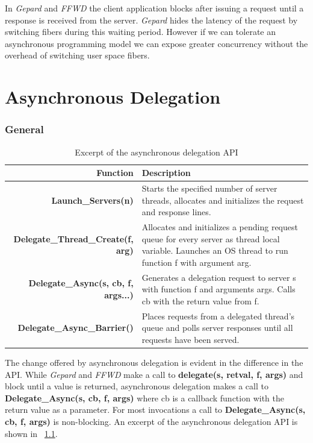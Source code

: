 \documentclass{uicthesi}
\begin{document}
In \textit{Gepard} and \textit{FFWD} the client application blocks after issuing a request until a response is received from the server. \textit{Gepard} hides the latency of the request by switching fibers during this waiting period. However if we can tolerate an asynchronous programming model we can expose greater concurrency without the overhead of switching user space fibers. 


\chapter{Asynchronous Delegation}
\subsection{General}
\begin{table}[ht!]
\begin{tabularx}{\linewidth}{| r | X |} %
  \hline
  \bf{Function} & \bf{Description} \\
  \hline
  \bf{Launch\_Servers(n)} & Starts the specified number of server threads, allocates and initializes the request and response lines. \\
  \hline
  \bf{Delegate\_Thread\_Create(f, arg)} & Allocates and initializes a pending request queue for every server as thread local variable. Launches an OS thread to run function f with argument arg. \\
  \hline
  \bf{Delegate\_Async(s, cb, f, args...)} & Generates a delegation request to server s with function f and arguments args. Calls cb with the return value from f. \\
  \hline
  \bf{Delegate\_Async\_Barrier()} & Places requests from a delegated thread's queue and polls server responses until all requests have been served. \\
  \hline
\end{tabularx}
\label{tab:api}
\caption{Excerpt of the asynchronous delegation API}
\end{table}

The change offered by asynchronous delegation is evident in the difference in the API. While \textit{Gepard} and \textit{FFWD} make a call to \textbf{delegate(s, retval, f, args)} and block until a value is returned, asynchronous delegation makes a call to \textbf{Delegate\_Async(s, cb, f, args)} where cb is a callback function with the return value as a parameter. For most invocations a call to \textbf{Delegate\_Async(s, cb, f, args)} is non-blocking. 
An excerpt of the asynchronous delegation API is shown in ~\ref{tab:api}. 
\end{document}

